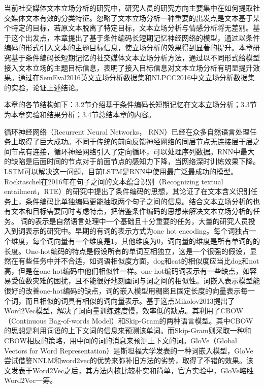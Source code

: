 
当前社交媒体文本立场分析的研究中，研究人员的研究方向主要集中在如何提取社交媒体文本有效的分类特征。忽略了文本立场分析一种重要的出发点是文本基于某个特定的目标，若原文本脱离了特定目标，文本立场分析与情感分析将无差别。基于这个出发点，本章提出了基于条件编码长短期记忆神经网络的模型，通过以条件编码的形式引入文本的主题目标信息，使立场分析的效果得到显著的提升。本章研究基于条件编码长短期记忆的社交媒体文本立场分析方法，通过以不同形式给模型接入文本立场的主题目标信息，表明了接入目标信息对文本立场分析有明显提升效果。通过在SemEval2016英文立场分析数据集和NLPCC2016中文立场分析数据集的实验，论证上述结论。

本章的各节结构如下：3.2节介绍基于条件编码长短期记忆在文本立场分析；3.3节为本章实验和结果分析；3.4节总结本章的内容。

循环神经网络（Recurrent Neural Networks， RNN）已经在众多自然语言处理任务上取得了巨大成功。不同于传统的前向反馈神经网络的同层节点无连接层于层之间节点有连接，循环神经网络引入了定向循环，可以处理序列数据。RNN中最大的缺陷是后面时间的节点对于前面节点的感知力下降，当网络深时训练效果下降。LSTM可以解决这一问题，目前LSTM是RNN中使用最广泛最成功的模型。Rocktaschel在2016年在句子之间的文本蕴含识别（Recognizing textual entailment，RTE）的研究中提出了条件编码的思想，其论证了在文本含义识别任务上，条件编码比单独编码更能抽取两个句子之间的信息。结合文本立场分析的也有文本和目标需要同时考虑特点，把借鉴条件编码的思想来解决文本立场分析的任务。
词的表示是自然语言处理中一个基础且十分重要的任务，大量的研究人员投入到词表示的研究中。早期的有词的表示方式为one hot encoding。每个词独占一个维度，每个词向量有一个维度是1，其他维度为0，词向量的维度是所有单词的的长度。One-hot编码的特点是假设所有的单词互相独立，这是一个很强的假设，显然在有些任务中并不合适，如词语相似度方面，dog和cat的相似度应当比dog和not高，但是在one hot编码中他们相似性一样。one-hot编码词表示有一些缺点，如容易受位数灾难的困扰，且不能很好地刻画词与词之间的相似性。词嵌入表示模型能很好的改善one-hot编码的缺点，词的嵌入模型用稠密且固定长度的向量表示每一个词，而且相似的词具有相似的词向量表示。基于这点Mikolov2013提出了Word2Vec模型，解决了词向量训练速度慢，效率低的缺点。其利用了CBOW（Continuous Bag-of-words Model）和Skip-Gram的两种语言模型。其中CBOW的思想是利用词语的上下文词的信息来预测该单词。而Skip-Gram则采取一种和CBOW相反的策略，用中间的词的消息来预测上下文的词。GloVe（Global Vectors for Word Representation）是斯坦福大学发表的一种词嵌入模型，GloVe尝试借鉴NNLM和word2vec的优势来弥补旧方法的劣势，取得了不错的效果。该文发表于Word2Vec之后，其方法内核比较朴实和简单，官方实验中，GloVe略胜Word2Vec一筹。

